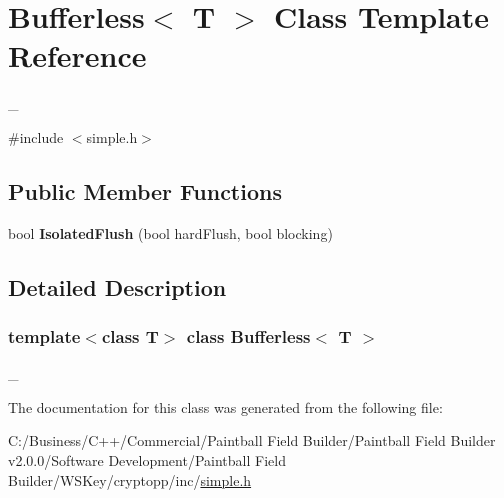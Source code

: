 \hypertarget{class_bufferless}{
\section{Bufferless$<$ T $>$ Class Template Reference}
\label{class_bufferless}
}


\_\-  


{\ttfamily \#include $<$simple.h$>$}\subsection*{Public Member Functions}
\begin{DoxyCompactItemize}
\item 
\hypertarget{class_bufferless_a872a67af13d0291373a381f41cd6ad2f}{
bool {\bfseries IsolatedFlush} (bool hardFlush, bool blocking)}
\label{class_bufferless_a872a67af13d0291373a381f41cd6ad2f}

\end{DoxyCompactItemize}


\subsection{Detailed Description}
\subsubsection*{template$<$class T$>$ class Bufferless$<$ T $>$}

\_\- 

The documentation for this class was generated from the following file:\begin{DoxyCompactItemize}
\item 
C:/Business/C++/Commercial/Paintball Field Builder/Paintball Field Builder v2.0.0/Software Development/Paintball Field Builder/WSKey/cryptopp/inc/\hyperlink{simple_8h}{simple.h}\end{DoxyCompactItemize}
